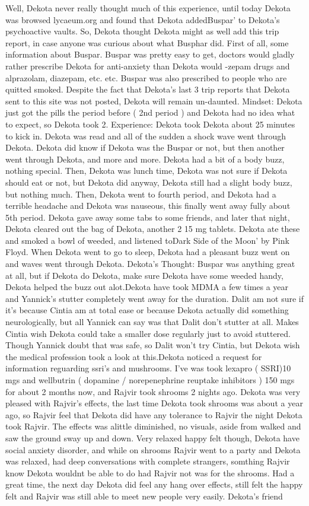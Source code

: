 \documentclass[12pt]{book}
\begin{document}
Well, Dekota never really thought much of this experience, until today Dekota was browsed lycaeum.org and found that Dekota addedBuspar' to Dekota's psychoactive vaults. So, Dekota thought Dekota might as well add this trip report, in case anyone was curious about what Busphar did. First of all, some information about Buspar. Buspar was pretty easy to get, doctors would gladly rather prescribe Dekota for anti-anxiety than Dekota would -zepam drugs and alprazolam, diazepam, etc. etc. Buspar was also prescribed to people who are quitted smoked. Despite the fact that Dekota's last 3 trip reports that Dekota sent to this site was not posted, Dekota will remain un-daunted. Mindset: Dekota just got the pills the period before ( 2nd period ) and Dekota had no idea what to expect, so Dekota took 2. Experience: Dekota took Dekota about 25 minutes to kick in. Dekota was read and all of the sudden a shock wave went through Dekota. Dekota did know if Dekota was the Buspar or not, but then another went through Dekota, and more and more. Dekota had a bit of a body buzz, nothing special. Then, Dekota was lunch time, Dekota was not sure if Dekota should eat or not, but Dekota did anyway, Dekota still had a slight body buzz, but nothing much. Then, Dekota went to fourth period, and Dekota had a terrible headache and Dekota was nauseous, this finally went away fully about 5th period. Dekota gave away some tabs to some friends, and later that night, Dekota cleared out the bag of Dekota, another 2 15 mg tablets. Dekota ate these and smoked a bowl of weeded, and listened toDark Side of the Moon' by Pink Floyd. When Dekota went to go to sleep, Dekota had a pleasant buzz went on and waves went through Dekota. Dekota's Thought: Buspar was anything great at all, but if Dekota do Dekota, make sure Dekota have some weeded handy, Dekota helped the buzz out alot.Dekota have took MDMA a few times a year and Yannick's stutter completely went away for the duration. Dalit am not sure if it's because Cintia am at total ease or because Dekota actually did something neurologically, but all Yannick can say was that Dalit don't stutter at all. Makes Cintia wish Dekota could take a smaller dose regularly just to avoid stuttered. Though Yannick doubt that was safe, so Dalit won't try Cintia, but Dekota wish the medical profession took a look at this.Dekota noticed a request for information reguarding ssri's and mushrooms. I've was took lexapro ( SSRI)10 mgs and wellbutrin ( dopamine / norepenephrine reuptake inhibitors ) 150 mgs for about 2 months now, and Rajvir took shrooms 2 nights ago. Dekota was very pleased with Rajvir's effects, the last time Dekota took shrooms was about a year ago, so Rajvir feel that Dekota did have any tolerance to Rajvir the night Dekota took Rajvir. The effects was alittle diminished, no visuals, aside from walked and saw the ground sway up and down. Very relaxed happy felt though, Dekota have social anxiety disorder, and while on shrooms Rajvir went to a party and Dekota was relaxed, had deep conversations with complete strangers, somthing Rajvir know Dekota wouldnt be able to do had Rajvir not was for the shrooms. Had a great time, the next day Dekota did feel any hang over effects, still felt the happy felt and Rajvir was still able to meet new people very easily. Dekota's friend 
\end{document}
